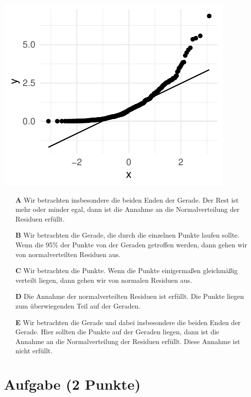 \documentclass[a4paper, 9pt]{scrartcl}\usepackage[]{graphicx}\usepackage[]{xcolor}
\makeatletter
\def\maxwidth{ %
  \ifdim\Gin@nat@width>\linewidth
    \linewidth
  \else
    \Gin@nat@width
  \fi
}
\makeatother
\begin{document}
{\centering \includegraphics[width=\maxwidth]{img/mc-regression-05-a-1} 

}







\begin{enumerate}
\item [\textbf{A} \msquare] Wir betrachten insbesondere die beiden Enden der Gerade. Der Rest ist mehr oder minder egal, dann ist die Annahme an die Normalverteilung der Residuen erfüllt.
\item [\textbf{B} \msquare] Wir betrachten die Gerade, die durch die einzelnen Punkte laufen sollte. Wenn die 95\% der Punkte von der Geraden getroffen werden, dann gehen wir von normalverteilten Residuen aus.
\item [\textbf{C} \msquare] Wir betrachten die Punkte. Wenn die Punkte einigermaßen gleichmäßig verteilt liegen, dann gehen wir von normalen Residuen aus.
\item [\textbf{D} \msquare] Die Annahme der normalverteilten Residuen ist erfüllt. Die Punkte liegen zum überwiegenden Teil auf der Geraden.
\item [\textbf{E} \msquare] Wir betrachten die Gerade und dabei insbesondere die beiden Enden der Gerade. Hier sollten die Punkte auf der Geraden liegen, dann ist die Annahme an die Normalverteilung der Residuen erfüllt. Diese Annahme ist nicht erfüllt.
\end{enumerate}

\section{Aufgabe \hfill (2 Punkte)}
\end{document}
